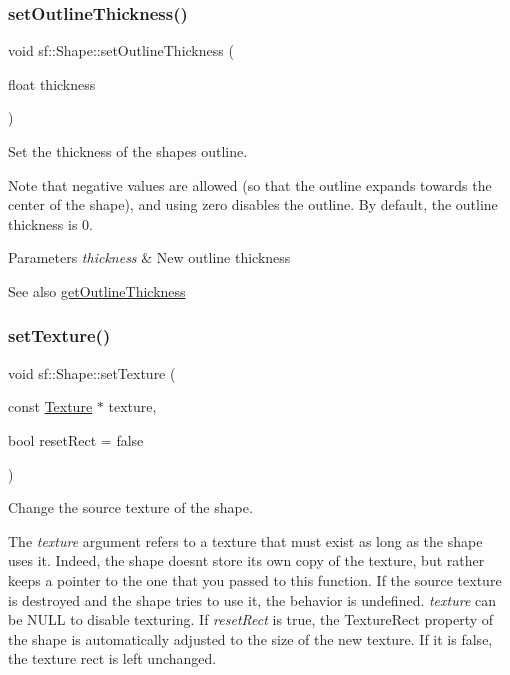 \subsubsection{\texorpdfstring{set\+Outline\+Thickness()}{setOutlineThickness()}}
{\footnotesize\ttfamily void sf\+::\+Shape\+::set\+Outline\+Thickness (\begin{DoxyParamCaption}\item[{float}]{thickness }\end{DoxyParamCaption})}



Set the thickness of the shape\textquotesingle{}s outline. 

Note that negative values are allowed (so that the outline expands towards the center of the shape), and using zero disables the outline. By default, the outline thickness is 0.


\begin{DoxyParams}{Parameters}
{\em thickness} & New outline thickness\\
\hline
\end{DoxyParams}
\begin{DoxySeeAlso}{See also}
\hyperlink{classsf_1_1_shape_a1d4d5299c573a905e5833fc4dce783a7}{get\+Outline\+Thickness} 
\end{DoxySeeAlso}
\mbox{\label{classsf_1_1_shape_af8fb22bab1956325be5d62282711e3b6}} 
\subsubsection{\texorpdfstring{set\+Texture()}{setTexture()}}
{\footnotesize\ttfamily void sf\+::\+Shape\+::set\+Texture (\begin{DoxyParamCaption}\item[{const \hyperlink{classsf_1_1_texture}{Texture} $\ast$}]{texture,  }\item[{bool}]{reset\+Rect = {\ttfamily false} }\end{DoxyParamCaption})}



Change the source texture of the shape. 

The {\itshape texture} argument refers to a texture that must exist as long as the shape uses it. Indeed, the shape doesn\textquotesingle{}t store its own copy of the texture, but rather keeps a pointer to the one that you passed to this function. If the source texture is destroyed and the shape tries to use it, the behavior is undefined. {\itshape texture} can be N\+U\+LL to disable texturing. If {\itshape reset\+Rect} is true, the Texture\+Rect property of the shape is automatically adjusted to the size of the new texture. If it is false, the texture rect is left unchanged.


